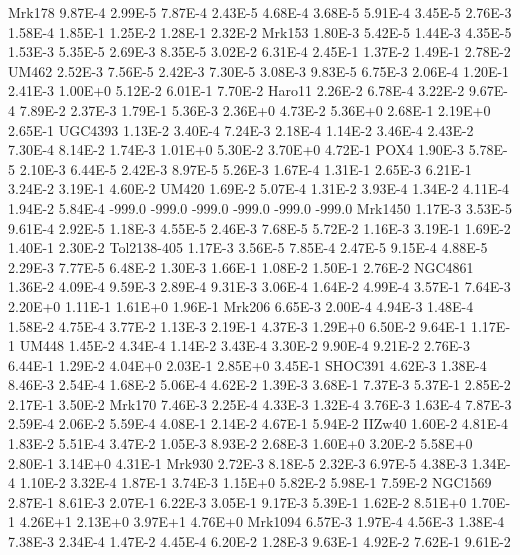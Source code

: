          Mrk178   9.87E-4  2.99E-5   7.87E-4  2.43E-5   4.68E-4  3.68E-5   5.91E-4  3.45E-5   2.76E-3  1.58E-4   1.85E-1  1.25E-2   1.28E-1  2.32E-2 
         Mrk153   1.80E-3  5.42E-5   1.44E-3  4.35E-5   1.53E-3  5.35E-5   2.69E-3  8.35E-5   3.02E-2  6.31E-4   2.45E-1  1.37E-2   1.49E-1  2.78E-2 
          UM462   2.52E-3  7.56E-5   2.42E-3  7.30E-5   3.08E-3  9.83E-5   6.75E-3  2.06E-4   1.20E-1  2.41E-3   1.00E+0  5.12E-2   6.01E-1  7.70E-2 
         Haro11   2.26E-2  6.78E-4   3.22E-2  9.67E-4   7.89E-2  2.37E-3   1.79E-1  5.36E-3   2.36E+0  4.73E-2   5.36E+0  2.68E-1   2.19E+0  2.65E-1 
        UGC4393   1.13E-2  3.40E-4   7.24E-3  2.18E-4   1.14E-2  3.46E-4   2.43E-2  7.30E-4   8.14E-2  1.74E-3   1.01E+0  5.30E-2   3.70E+0  4.72E-1 
           POX4   1.90E-3  5.78E-5   2.10E-3  6.44E-5   2.42E-3  8.97E-5   5.26E-3  1.67E-4   1.31E-1  2.65E-3   6.21E-1  3.24E-2   3.19E-1  4.60E-2 
          UM420   1.69E-2  5.07E-4   1.31E-2  3.93E-4   1.34E-2  4.11E-4   1.94E-2  5.84E-4   -999.0    -999.0    -999.0   -999.0    -999.0  -999.0  
        Mrk1450   1.17E-3  3.53E-5   9.61E-4  2.92E-5   1.18E-3  4.55E-5   2.46E-3  7.68E-5   5.72E-2  1.16E-3   3.19E-1  1.69E-2   1.40E-1  2.30E-2 
    Tol2138-405   1.17E-3  3.56E-5   7.85E-4  2.47E-5   9.15E-4  4.88E-5   2.29E-3  7.77E-5   6.48E-2  1.30E-3   1.66E-1  1.08E-2   1.50E-1  2.76E-2 
        NGC4861   1.36E-2  4.09E-4   9.59E-3  2.89E-4   9.31E-3  3.06E-4   1.64E-2  4.99E-4   3.57E-1  7.64E-3   2.20E+0  1.11E-1   1.61E+0  1.96E-1 
         Mrk206   6.65E-3  2.00E-4   4.94E-3  1.48E-4   1.58E-2  4.75E-4   3.77E-2  1.13E-3   2.19E-1  4.37E-3   1.29E+0  6.50E-2   9.64E-1  1.17E-1 
          UM448   1.45E-2  4.34E-4   1.14E-2  3.43E-4   3.30E-2  9.90E-4   9.21E-2  2.76E-3   6.44E-1  1.29E-2   4.04E+0  2.03E-1   2.85E+0  3.45E-1 
        SHOC391   4.62E-3  1.38E-4   8.46E-3  2.54E-4   1.68E-2  5.06E-4   4.62E-2  1.39E-3   3.68E-1  7.37E-3   5.37E-1  2.85E-2   2.17E-1  3.50E-2 
         Mrk170   7.46E-3  2.25E-4   4.33E-3  1.32E-4   3.76E-3  1.63E-4   7.87E-3  2.59E-4   2.06E-2  5.59E-4   4.08E-1  2.14E-2   4.67E-1  5.94E-2 
         IIZw40   1.60E-2  4.81E-4   1.83E-2  5.51E-4   3.47E-2  1.05E-3   8.93E-2  2.68E-3   1.60E+0  3.20E-2   5.58E+0  2.80E-1   3.14E+0  4.31E-1 
         Mrk930   2.72E-3  8.18E-5   2.32E-3  6.97E-5   4.38E-3  1.34E-4   1.10E-2  3.32E-4   1.87E-1  3.74E-3   1.15E+0  5.82E-2   5.98E-1  7.59E-2 
        NGC1569   2.87E-1  8.61E-3   2.07E-1  6.22E-3   3.05E-1  9.17E-3   5.39E-1  1.62E-2   8.51E+0  1.70E-1   4.26E+1  2.13E+0   3.97E+1  4.76E+0 
        Mrk1094   6.57E-3  1.97E-4   4.56E-3  1.38E-4   7.38E-3  2.34E-4   1.47E-2  4.45E-4   6.20E-2  1.28E-3   9.63E-1  4.92E-2   7.62E-1  9.61E-2 
